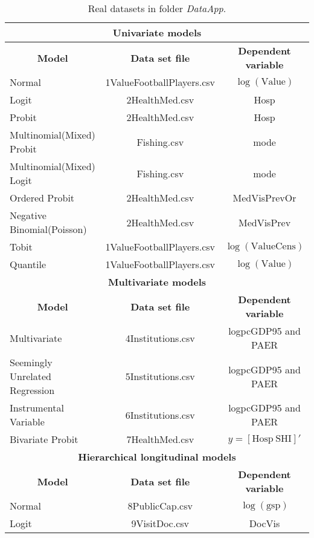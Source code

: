\begin{table}[!ht]
	\begin{center}
	\caption{Real datasets in folder \textit{DataApp}.} \label{tab:appdata}
	{{
	\begin{tabular}{|l|c|c|}
	\hline 
	\multicolumn{3}{|c|}{\textbf{Univariate models}} \\
	\hline  
	 \multicolumn{1}{|c|}{\textbf{Model}} & \multicolumn{1}{c}{\textbf{Data set file}} & \multicolumn{1}{|c|}{\textbf{Dependent variable}} \\ 
	 \hline 
	Normal & 1ValueFootballPlayers.csv & $\log(\text{Value})$ \\
	Logit & 2HealthMed.csv & Hosp\\
	Probit & 2HealthMed.csv & Hosp \\
	Multinomial(Mixed) Probit  & Fishing.csv & mode \\
	Multinomial(Mixed) Logit  & Fishing.csv & mode \\
	Ordered Probit  &  2HealthMed.csv & MedVisPrevOr\\
	Negative Binomial(Poisson)   & 2HealthMed.csv & MedVisPrev\\
	Tobit   & 1ValueFootballPlayers.csv & $\log(\text{ValueCens})$ \\
	Quantile &  1ValueFootballPlayers.csv & $\log(\text{Value})$ \\
	\hline 
	\multicolumn{3}{|c|}{\textbf{Multivariate models}} \\
	\hline  
	\multicolumn{1}{|c|}{\textbf{Model}} & \multicolumn{1}{c}{\textbf{Data set file}} & \multicolumn{1}{|c|}{\textbf{Dependent variable}}\\ 
	\hline
	Multivariate   & 4Institutions.csv & logpcGDP95 and PAER \\
	Seemingly Unrelated Regression & 5Institutions.csv & logpcGDP95 and PAER\\
	Instrumental Variable  & 6Institutions.csv & logpcGDP95 and PAER \\
	Bivariate Probit   & 7HealthMed.csv & $y=\left[\text{Hosp} \ \text{SHI}\right]'$\\
	\hline
	\multicolumn{3}{|c|}{\textbf{Hierarchical longitudinal models}} \\
	\hline  
	\multicolumn{1}{|c|}{\textbf{Model}} & \multicolumn{1}{c}{\textbf{Data set file}} & \multicolumn{1}{|c|}{\textbf{Dependent variable}} \\ 
	\hline
	Normal & 8PublicCap.csv  & $\log(\text{gsp})$ \\
	\hline
	Logit & 9VisitDoc.csv  & DocVis \\

\end{tabular}}}
\end{center}
\end{table}
